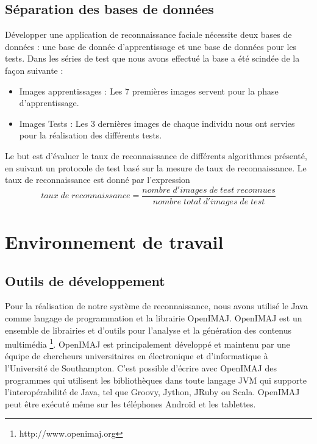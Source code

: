 \subsection{Séparation des bases de données}
Développer une application de reconnaissance faciale nécessite deux bases de données : une base de donnée d'apprentissage et une base de données pour les tests.
Dans les séries de test que nous avons effectué la base a été scindée de la façon suivante :
\begin{itemize}
	\item [\textbullet] Images apprentissages : Les 7 premières images servent pour la phase d'apprentissage.
	\item [\textbullet] Images Tests : Les 3 dernières images de chaque individu nous ont servies pour la réalisation des différents tests.
\end{itemize}
Le but est d'évaluer le taux de reconnaissance de  différents algorithmes présenté, en 
suivant un protocole de test basé sur la mesure de taux de reconnaissance. Le taux de reconnaissance est donné par l'expression 
$$taux\; de\; reconnaissance=\frac{nombre\; d'images\; de \;test\; reconnues}{nombre\; total\; d'images\; de \;test}$$
\section{Environnement de travail}

\subsection{Outils de développement}
Pour la réalisation de notre système de reconnaissance, nous avons utilisé le Java comme langage de programmation et la librairie OpenIMAJ. OpenIMAJ est un ensemble de librairies et d'outils pour l'analyse et la génération des contenus multimédia \footnote{http://www.openimaj.org}.  OpenIMAJ est principalement développé et maintenu par une équipe de chercheurs universitaires en électronique et d'informatique à l'Université de Southampton.
\nocite{OPEN}
\nocite{TUTO}
C'est possible d'écrire avec OpenIMAJ des programmes qui utilisent les bibliothèques dans toute langage JVM qui supporte
l'interopérabilité de Java, tel que Groovy, Jython, JRuby ou Scala. OpenIMAJ peut être exécuté même sur les téléphones Androïd et les tablettes.

